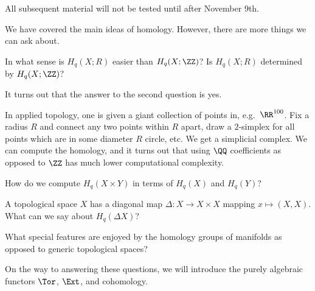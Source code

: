 \documentclass{standalone}
\begin{document}
\begin{note}
  All subsequent material will not be tested until after November 9th.
\end{note}

We have covered the main ideas of homology.
However, there are more things we can ask about.
\begin{question}
  In what sense is \(H_q(X; R)\) easier than \(H_q(X; \ZZ)\)?
  Is \(H_q(X; R)\) determined by \(H_q(X; \ZZ)\)?
\end{question}
It turns out that the answer to the second question is yes.

\begin{note}
  In applied topology, one is given a giant collection of points in,
  e.g.\ \(\RR^{100}\). Fix a radius \(R\) and connect any two points
  within \(R\) apart, draw a \(2\)-simplex for all points which are in some
  diameter \(R\) circle, etc.
  We get a simplicial complex.
  We can compute the homology, and it turns out that using \(\QQ\) coefficients
  as opposed to \(\ZZ\) has much lower computational complexity.
\end{note}

\begin{question}
  How do we compute \(H_q(X \times Y)\) in terms of \(H_q(X)\) and \(H_q(Y)\)?
\end{question}

\begin{question}
  A topological space \(X\) has a diagonal map
  \(\Delta \colon X \to X \times X\) mapping \(x \mapsto (X, X)\).
  What can we say about \(H_q(\Delta X)\)?
\end{question}

\begin{question}
  What special features are enjoyed by the homology groups of manifolds
  as opposed to generic topological spaces?
\end{question}

On the way to answering these questions,
we will introduce the purely algebraic functors \(\Tor\), \(\Ext\),
and cohomology.
\end{document}
